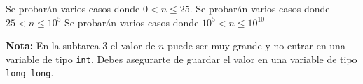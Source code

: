 \documentclass{oci}
\begin{document}
\begin{scoreDescription}
   Se probarán varios casos donde $0 < n \leq 25$.
   Se probarán varios casos donde $25 < n \leq 10^5$
   Se probarán varios casos donde $10^5 < n \leq 10^{10}$
\end{scoreDescription}
\textbf{Nota:} En la subtarea 3 el valor de $n$ puede ser muy grande y no entrar en una variable de tipo \texttt{int}. Debes asegurarte de guardar el valor en una variable de tipo \texttt{long long}.

\begin{sampleDescription}
\end{sampleDescription}
\end{document}

